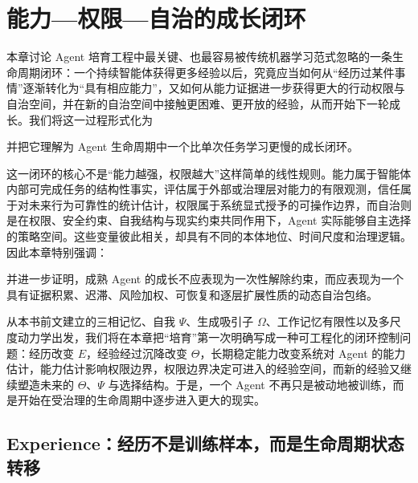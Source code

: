 \chapter{能力—权限—自治的成长闭环}

\begin{chapterlead}
本章讨论 Agent 培育工程中最关键、也最容易被传统机器学习范式忽略的一条生命周期闭环：一个持续智能体获得更多经验以后，究竟应当如何从“经历过某件事情”逐渐转化为“具有相应能力”，又如何从能力证据进一步获得更大的行动权限与自治空间，并在新的自治空间中接触更困难、更开放的经验，从而开始下一轮成长。我们将这一过程形式化为
\begin{statementbox}
\centering
{}
\end{statementbox}
并把它理解为 Agent 生命周期中一个比单次任务学习更慢的成长闭环。

这一闭环的核心不是“能力越强，权限越大”这样简单的线性规则。能力属于智能体内部可完成任务的结构性事实，评估属于外部或治理层对能力的有限观测，信任属于对未来行为可靠性的统计估计，权限属于系统显式授予的可操作边界，而自治则是在权限、安全约束、自我结构与现实约束共同作用下，Agent 实际能够自主选择的策略空间。这些变量彼此相关，却具有不同的本体地位、时间尺度和治理逻辑。因此本章特别强调：
\begin{statementbox}
\centering
{}
\end{statementbox}
并进一步证明，成熟 Agent 的成长不应表现为一次性解除约束，而应表现为一个具有证据积累、迟滞、风险加权、可恢复和逐层扩展性质的动态自治包络。

从本书前文建立的三相记忆、自我 $\Psi$、生成吸引子 $\Omega$、工作记忆有限性以及多尺度动力学出发，我们将在本章把“培育”第一次明确写成一种可工程化的闭环控制问题：经历改变 $E$，经验经过沉降改变 $\Theta$，长期稳定能力改变系统对 Agent 的能力估计，能力估计影响权限边界，权限边界决定可进入的经验空间，而新的经验又继续塑造未来的 $\Theta$、$\Psi$ 与选择结构。于是，一个 Agent 不再只是被动地被训练，而是开始在受治理的生命周期中逐步进入更大的现实。
\end{chapterlead}


\section{Experience：经历不是训练样本，而是生命周期状态转移}

